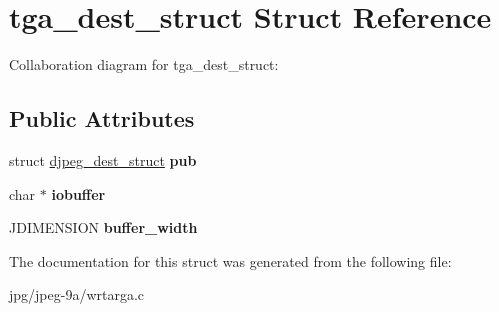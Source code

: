 \hypertarget{structtga__dest__struct}{\section{tga\+\_\+dest\+\_\+struct Struct Reference}
\label{structtga__dest__struct}
}


Collaboration diagram for tga\+\_\+dest\+\_\+struct\+:
\subsection*{Public Attributes}
\begin{DoxyCompactItemize}
\item 
\hypertarget{structtga__dest__struct_a9126baa39a8bcbeeee5d7f4a92292abc}{struct \hyperlink{structdjpeg__dest__struct}{djpeg\+\_\+dest\+\_\+struct} {\bfseries pub}}\label{structtga__dest__struct_a9126baa39a8bcbeeee5d7f4a92292abc}

\item 
\hypertarget{structtga__dest__struct_a45e25517ef01f07c17d1a0676bbdf697}{char $\ast$ {\bfseries iobuffer}}\label{structtga__dest__struct_a45e25517ef01f07c17d1a0676bbdf697}

\item 
\hypertarget{structtga__dest__struct_a5e7a6354aa1cb82b9a9021ba3b880b97}{J\+D\+I\+M\+E\+N\+S\+I\+O\+N {\bfseries buffer\+\_\+width}}\label{structtga__dest__struct_a5e7a6354aa1cb82b9a9021ba3b880b97}

\end{DoxyCompactItemize}


The documentation for this struct was generated from the following file\+:\begin{DoxyCompactItemize}
\item 
jpg/jpeg-\/9a/wrtarga.\+c\end{DoxyCompactItemize}
